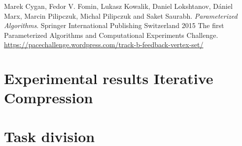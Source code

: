 \documentclass[a4paper,10pt]{article}
\begin{document}
\begin{thebibliography}{9}
 Marek Cygan, Fedor V. Fomin, Lukasz Kowalik, Daniel Lokshtanov, Dániel Marx, Marcin Pilipczuk, Michal Pilipczuk and Saket Saurabh. \textit{Parameterized Algorithms}. Springer International Publishing Switzerland 2015
 The first Parameterized Algorithms and Computational Experiments Challenge. \url{https://pacechallenge.wordpress.com/track-b-feedback-vertex-set/}
\end{thebibliography}

\clearpage
\appendix
\section{Experimental results Iterative Compression} \label{app:itcomp}


\section{Task division}

\end{document}
